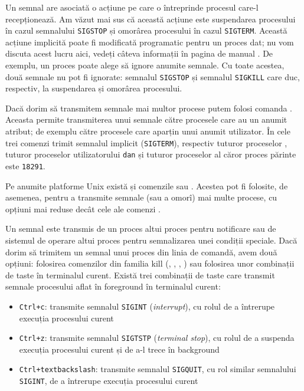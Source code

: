 Un semnal are asociată o acțiune pe care o întreprinde procesul care-l recepționează.
Am văzut mai sus că această acțiune este suspendarea procesului în cazul semnalului \texttt{SIGSTOP} și omorârea procesului în cazul \texttt{SIGTERM}.
Această acțiune implicită poate fi modificată programatic pentru un proces dat;
nu vom discuta acest lucru aici, vedeți câteva informații în pagina de manual .
De exemplu, un proces poate alege să ignore anumite semnale.
Cu toate acestea, două semnale nu pot fi ignorate: semnalul \texttt{SIGSTOP} și semnalul \texttt{SIGKILL} care duc, respectiv, la suspendarea și omorârea procesului.

Dacă dorim să transmitem semnale mai multor procese putem folosi comanda .
Aceasta permite transmiterea unui semnale către procesele care au un anumit atribut;
de exemplu către procesele care aparțin unui anumit utilizator.
În  cele trei comenzi trimit semnalul implicit (\texttt{SIGTERM}), respectiv tuturor proceselor , tuturor proceselor utilizatorului \texttt{dan} și tuturor proceselor al căror proces părinte este \texttt{18291}.


Pe anumite platforme Unix există și comenzile  sau .
Acestea pot fi folosite, de asemenea, pentru a transmite semnale (sau a omorî) mai multe procese, cu opțiuni mai reduse decât cele ale comenzi .

Un semnal este transmis de un proces altui proces pentru notificare sau de sistemul de operare altui proces pentru semnalizarea unei condiții speciale.
Dacă dorim să trimitem un semnal unui proces din linia de comandă, avem două opțiuni: folosirea comenzilor din familia kill (, , , ) sau folosirea unor combinații de taste în terminalul curent.
Există trei combinații de taste care transmit semnale procesului aflat în foreground în terminalul curent:

\begin{itemize}
  \item \texttt{Ctrl+c}: transmite semnalul \texttt{SIGINT} (\textit{interrupt}), cu rolul de a întrerupe execuția procesului curent
  \item \texttt{Ctrl+z}: transmite semnalul \texttt{SIGTSTP} (\textit{terminal stop}), cu rolul de a suspenda execuția procesului curent și de a-l trece în background
  \item \texttt{Ctrl+textbackslash{}}: transmite semnalul \texttt{SIGQUIT}, cu rol similar semnalului \texttt{SIGINT}, de a întrerupe execuția procesului curent
\end{itemize}

